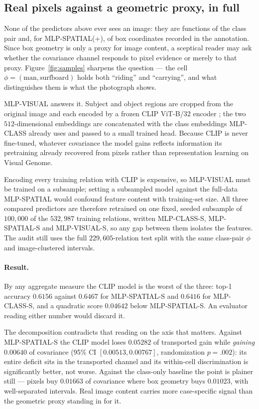 \subsection{Real pixels against a geometric proxy, in full}\label{app:vgvisual-full}

None of the predictors above ever sees an image: they are functions of the class pair and,
for MLP-SPATIAL(+), of box coordinates recorded in the annotation. Since box geometry is
only a proxy for image content, a sceptical reader may ask whether the covariance channel
responds to pixel evidence or merely to that proxy. Figure~\ref{fig:samples} sharpens the
question --- the cell $\phi=(\text{man},\text{surfboard})$ holds both ``riding'' and
``carrying'', and what distinguishes them is what the photograph shows.

MLP-VISUAL answers it. Subject and object regions are cropped from the original image and
each encoded by a frozen CLIP ViT-B/32 encoder \citep{radford2021learning}; the two
$512$-dimensional embeddings are concatenated with the class embeddings MLP-CLASS already
uses and passed to a small trained head. Because CLIP is never fine-tuned, whatever
covariance the model gains reflects information its pretraining already recovered from
pixels rather than representation learning on Visual Genome.

Encoding every training relation with CLIP is expensive, so MLP-VISUAL must be trained on a
subsample; setting a subsampled model against the full-data MLP-SPATIAL would confound
feature content with training-set size. All three compared predictors are therefore
retrained on one fixed, seeded subsample of $100{,}000$ of the $532{,}987$ training
relations, written MLP-CLASS-S, MLP-SPATIAL-S and MLP-VISUAL-S, so any gap between them
isolates the features. The audit still uses the full $229{,}605$-relation test split with
the same class-pair $\phi$ and image-clustered intervals.

\paragraph{Result.} By any aggregate measure the CLIP model is the worst of the three: top-1
accuracy $0.6156$ against $0.6467$ for MLP-SPATIAL-S and $0.6416$ for MLP-CLASS-S, and a
quadratic score $0.04642$ below MLP-SPATIAL-S. An evaluator reading either number would
discard it.

The decomposition contradicts that reading on the axis that matters. Against MLP-SPATIAL-S
the CLIP model loses $0.05282$ of transported gain while \emph{gaining} $0.00640$ of
covariance (95\% CI $[0.00513,0.00767]$, randomization $p=.002$): its entire deficit sits in
the transported channel and its within-cell discrimination is significantly better, not
worse. Against the class-only baseline the point is plainer still --- pixels buy $0.01663$
of covariance where box geometry buys $0.01023$, with well-separated intervals. Real image
content carries more case-specific signal than the geometric proxy standing in for it.

